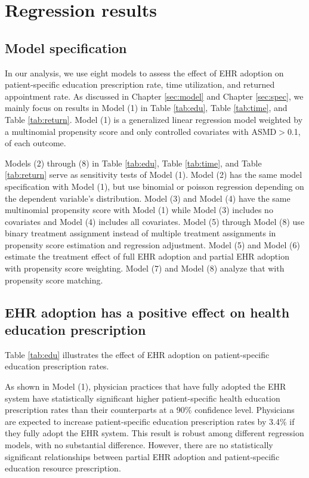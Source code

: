 \documentclass[12pt]{report}
\begin{document}
\chapter{Regression results}
\label{chapter: reg}

\section{Model specification}
In our analysis, we use eight models to assess the effect of EHR adoption on patient-specific education prescription rate, time utilization, and returned appointment rate. As discussed in Chapter \ref{sec:model} and Chapter \ref{sec:spec}, we mainly focus on results in Model (1) in Table \ref{tab:edu}, Table \ref{tab:time}, and Table \ref{tab:return}. Model (1) is a generalized linear regression model weighted by a multinomial propensity score and only controlled covariates with ASMD$>$0.1, of each outcome. 

Models (2) through (8) in Table \ref{tab:edu}, Table \ref{tab:time}, and Table \ref{tab:return} serve as sensitivity tests of Model (1). Model (2) has the same model specification with Model (1), but use binomial or poisson regression depending on the dependent variable's distribution. Model (3) and Model (4) have the same multinomial propensity score with Model (1) while Model (3) includes no covariates and Model (4) includes all covariates. Model (5) through Model (8) use binary treatment assignment instead of multiple treatment assignments in propensity score estimation and regression adjustment. Model (5) and Model (6) estimate the treatment effect of full EHR adoption and partial EHR adoption with propensity score weighting. Model (7) and Model (8) analyze that with propensity score matching. 

\section{EHR adoption has a positive effect on health education prescription}
Table \ref{tab:edu} illustrates the effect of EHR adoption on patient-specific education prescription rates. 

As shown in Model (1), physician practices that have fully adopted the EHR system have statistically significant higher patient-specific health education prescription rates than their counterparts at a 90\% confidence level. Physicians are expected to increase patient-specific education prescription rates by 3.4\% if they fully adopt the EHR system. This result is robust among different regression models, with no substantial difference. However, there are no statistically significant relationships between partial EHR adoption and patient-specific education resource prescription. 
\end{document}
